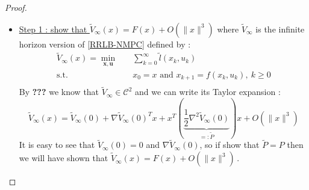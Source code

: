 \documentclass[12pt]{article}
\theoremstyle{definition}
\theoremstyle{remark}
\newcommand{\calC}{\mathcal{C}}
\newcommand{\ctwo}{\calC^2}
\begin{document}
\begin{proof}~
	\begin{itemize}[label=\textbullet]
		\item \underline{Step 1 : show that $\tilde{V}_\infty(x)=F(x)+O(\|x\|^3)$} \newline 
		where $\tilde{V}_\infty$ is the infinite horizon version of \ref{RRLB-NMPC} defined by :
		\begin{align*}
			\tilde{V}_\infty(x)=\underset{\mathbf{x},\mathbf{u}}{\min} &\quad\sum_{k=0}^\infty\tilde{l}(x_k,u_k)\\
			\text{s.t.} &\quad x_0=x\text{ and }x_{k+1}=f(x_k,u_k),~k\geq 0\\
		\end{align*}
		By \textbf{???} we know that $\tilde{V}_\infty\in\ctwo$ and we can write its Taylor expansion :
		$$\tilde{V}_\infty(x)=\tilde{V}_\infty(0)+\nabla\tilde{V}_\infty(0)^Tx+x^T\left( \underbrace{\frac{1}{2}\nabla^2\tilde{V}_\infty(0)}_{=:\tilde{P}}\right)x+O(\|x\|^3)$$
		It is easy to see that $\tilde{V}_\infty(0)=0$ and $\nabla\tilde{V}_\infty(0)$, so if show that $\tilde{P}=P$ then we will have shown that $\tilde{V}_\infty(x)=F(x)+O(\|x\|^3)$\,.


\end{itemize}
\end{proof}
\end{document}
